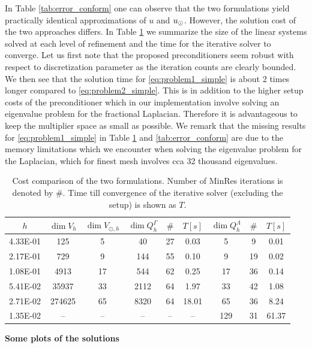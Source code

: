 \documentclass[r]{siamart171218}
\begin{document}
In Table \ref{tab:error_conform} one can observe that the two formulations
yield practically identical approximations of $u$ and $u_{\odot}$. However, the solution
cost of the two approaches differs. In Table \ref{tab:cost} we summarize the
size of the linear systems solved at each level of refinement and the time
for the iterative solver to converge. Let us first note that the proposed
preconditioners seem robust with respect to discretization parameter as
the iteration counts are clearly bounded. We then see that the solution
time for \eqref{eq:problem1_simple} is about 2 times longer compared to
\eqref{eq:problem2_simple}. This is in addition to the higher setup costs
of the preconditioner which in our implementation involve solving an eigenvalue
problem for the fractional Laplacian. Therefore it is advantageous to keep
the multiplier space as small as possible. We remark that the missing
results for \eqref{eq:problem1_simple} in Table \ref{tab:cost} and \ref{tab:error_conform}
are due to the memory limitations which we encounter when solving the eigenvalue problem
for the Laplacian, which for finest mesh involves cca 32 thousand eigenvalues.
%
\begin{table}
  \scriptsize{
  \begin{center}
    \begin{tabular}{c|cc|ccc|ccc}
      \hline
      $h$ & $\dim{V_h}$ & $\dim{V_{\odot, h}}$ & $\dim{Q^{\Gamma}_h}$ & $\#$ & $T\left[s\right]$ & $\dim{Q^{\Lambda}_h}$ & $\#$ & $T\left[s\right]$\\
      \hline
4.33E-01 &125    &5  &40    &27 &0.03  &5  &9  &0.01\\
2.17E-01 &729    &9  &144   &55 &0.10  &9  &19 &0.02\\
1.08E-01 &4913   &17 &544   &62 &0.25  &17 &36 &0.14\\
5.41E-02 &35937  &33 &2112  &64 &1.97  &33 &42 &1.08\\
2.71E-02 &274625 &65 &8320  &64 &18.01 &65 &36 &8.24\\
1.35E-02 &--     &-- &--    &-- &--    &129 &31 &61.37\\
\hline
    \end{tabular}
    \end{center}
    }
  \caption{Cost comparison of the two formulations. Number of MinRes iterations
    is denoted by $\#$. Time till convergence of the iterative solver (excluding the setup) is shown
    as $T$.
  }
\label{tab:cost}
\end{table}

\textbf{Some plots of the solutions}
\end{document}
